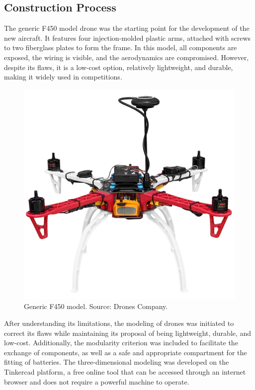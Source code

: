 \documentclass[conference]{IEEEtran}
\begin{document}
\subsection{Construction Process}

The generic F450 model drone was the starting point for the development of the new aircraft. It features four injection-molded plastic arms, attached with screws to two fiberglass plates to form the frame. In this model, all components are exposed, the wiring is visible, and the aerodynamics are compromised. However, despite its flaws, it is a low-cost option, relatively lightweight, and durable, making it widely used in competitions.

\begin{figure}[!htb]
    \centering
    \includegraphics[scale=0.07]{img/f450.jpg} 
    \caption{Generic F450 model. Source: Drones Company.}
    \label{fig:F450}
\end{figure}

After understanding its limitations, the modeling of drones was initiated to correct its flaws while maintaining its proposal of being lightweight, durable, and low-cost. Additionally, the modularity criterion was included to facilitate the exchange of components, as well as a safe and appropriate compartment for the fitting of batteries. The three-dimensional modeling was developed on the Tinkercad platform, a free online tool that can be accessed through an internet browser and does not require a powerful machine to operate.
\end{document}
